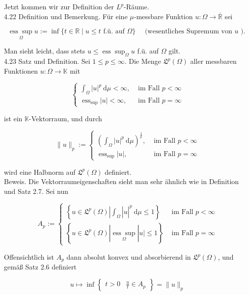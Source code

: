 \documentclass[10pt, letterpaper]{article}
\begin{document}
Jetzt kommen wir zur Definition der $L^{p}$-Räume.\\
4.22 Definition und Bemerkung. Für eine $\mu$-messbare Funktion $u: \Omega \rightarrow \overline{\mathbb{R}}$ sei

$$
\underset{\Omega}{\operatorname{ess} \sup } u:=\inf \{t \in \mathbb{R} \mid u \leq t \text { f.ü. auf } \Omega\} \quad \text { (wesentliches Supremum von } u \text { ). }
$$

Man sieht leicht, dass stets $u \leq \operatorname{ess} \sup _{\Omega} u$ f.ü. auf $\Omega$ gilt.\\
4.23 Satz und Definition. Sei $1 \leq p \leq \infty$. Die Menge $\mathfrak{L}^{p}(\Omega)$ aller messbaren Funktionen $u: \Omega \rightarrow \mathbb{K}$ mit

$$
\begin{cases}\int_{\Omega}|u|^{p} \mathrm{~d} \mu<\infty, & \text { im Fall } p<\infty \\ \operatorname{ess}_{\sup }|u|<\infty, & \text { im Fall } p=\infty\end{cases}
$$

ist ein $\mathbb{K}$-Vektorraum, und durch

$$
\|u\|_{p}:= \begin{cases}\left(\int_{\Omega}|u|^{p} \mathrm{~d} \mu\right)^{\frac{1}{p}}, & \text { im Fall } p<\infty \\ \operatorname{ess}_{\sup }|u|, & \text { im Fall } p=\infty\end{cases}
$$

wird eine Halbnorm auf $\mathfrak{L}^{p}(\Omega)$ definiert.\\
Beweis. Die Vektorraumeigenschaften sieht man sehr ähnlich wie in Definition und Satz 2.7. Sei nun

$$
A_{p}:= \begin{cases}\left\{\left.u \in \mathfrak{L}^{p}(\Omega)\left|\int_{\Omega}\right| u\right|^{p} \mathrm{~d} \mu \leq 1\right\} & \text { im Fall } p<\infty \\ \left\{u \in \mathfrak{L}^{p}(\Omega)|\underset{\Omega}{\operatorname{ess} \sup }| u \mid \leq 1\right\} & \text { im Fall } p=\infty\end{cases}
$$

Offensichtlich ist $A_{p}$ dann absolut konvex und absorbierend in $\mathfrak{L}^{p}(\Omega)$, und gemäß Satz 2.6 definiert

$$
u \mapsto \inf \left\{\begin{array}{l|l}
t>0 & \frac{u}{t} \in A_{p}
\end{array}\right\}=\|u\|_{p}
$$
\end{document}
